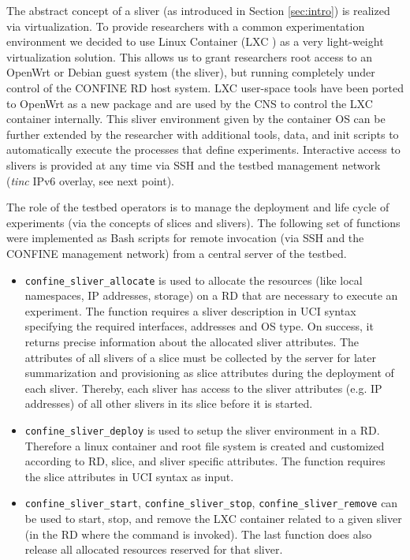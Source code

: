 \documentclass[conference]{IEEEtran}
\begin{document}

The abstract concept of a sliver (as introduced in Section \ref{sec:intro}) is realized via virtualization.  To
provide researchers with a common experimentation environment we
decided to use Linux Container (LXC \cite{lxc}) as a very light-weight
virtualization solution. This allows us to grant researchers root
access to an OpenWrt or Debian guest system (the sliver), but running
completely under control of the CONFINE RD host system. LXC user-space
tools have been ported to OpenWrt as a new package and are used by
the CNS to control the LXC container internally. This sliver
environment given by the container OS can be further extended by the
researcher with additional tools, data, and init scripts to
automatically execute the processes that define experiments.
Interactive access to slivers is provided at any time via SSH and the
testbed management network (\emph{tinc} IPv6 overlay, see next point).

The role of the testbed operators is to manage the deployment and life
cycle of experiments (via the concepts of slices and slivers). The
following set of functions were implemented as Bash scripts for remote
invocation (via SSH and the CONFINE management network) from a central
server of the testbed.
\begin{itemize}
\item \texttt{confine\_sliver\_allocate} is used to allocate the resources
  (like local namespaces, IP addresses, storage) on a RD that are
  necessary to execute an experiment. The function requires a sliver
  description in UCI syntax specifying the required interfaces,
  addresses and OS type. On success, it returns precise information
  about the allocated sliver attributes. The attributes of all slivers
  of a slice must be collected by the server for later summarization
  and provisioning as slice attributes during the deployment of each
  sliver. Thereby, each sliver has access to the sliver attributes (e.g. IP
  addresses) of all other slivers in its slice before it is started.
\item \texttt{confine\_sliver\_deploy} is used to setup the sliver environment
  in a RD. Therefore a linux container and root file system is created
  and customized according to RD, slice, and sliver specific
  attributes.  The function requires the slice attributes in UCI
  syntax as input.
\item \texttt{confine\_sliver\_start}, \texttt{confine\_sliver\_stop},
  \texttt{confine\_sliver\_remove} can be used to start, stop, and remove the
  LXC container related to a given sliver (in the RD where the command
  is invoked). The last function does also release all allocated
  resources reserved for that sliver.

\end{itemize}
\end{document}
